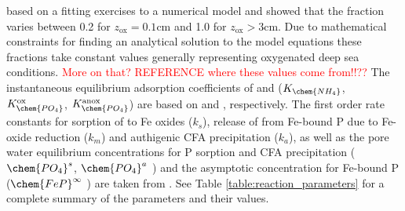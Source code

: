 \documentclass[gmd, manuscript]{copernicus}
\begin{document}
based on a fitting exercises to a numerical model and showed that the fraction varies between 0.2 for $z_{\mathrm{ox}}=0.1$cm and 1.0 for $z_{\mathrm{ox}}>3$cm. 
Due to mathematical constraints for finding an analytical solution to the model equations these fractions take constant values generally representing oxygenated deep sea conditions. 
\textcolor{red}{More on that? REFERENCE where these values come from!!??}
The instantaneous equilibrium adsorption coefficients of  and  ($K_{\chem{NH_4}}$, $K_\chem{PO_4}^{\mathrm{ox}}$, $K_\chem{PO_4}^{\mathrm{anox}}$) are based on \citet{wang_multicomponent_1996} and \citet{slomp1998role}, respectively.
The first order rate constants for sorption of  to Fe oxides ($k_s$), release of  from Fe-bound P due to Fe-oxide reduction ($k_m$) and 
authigenic CFA precipitation ($k_a$), as well as the pore water equilibrium concentrations for P sorption and CFA precipitation 
($\chem{PO_4}^s$, $\chem{PO_4}^a$ ) and the asymptotic concentration for Fe-bound P ($\chem{FeP}^\infty$ ) are taken from  \citet{caroline_p_slomp_key_1996}. 
See Table \ref{table:reaction_parameters} for a complete summary of the parameters and their values.

\end{document}
